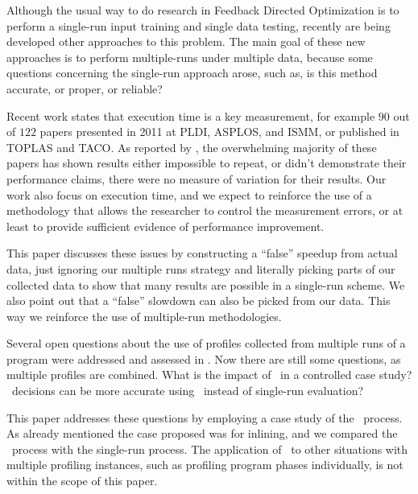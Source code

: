 
Although the usual way to do research in Feedback Directed Optimization is to perform a single-run input training and single data testing, recently are being developed other approaches to this problem. The main goal of these new approaches is to perform multiple-runs under multiple data, because some questions concerning the single-run approach arose, such as, is this method accurate, or proper, or reliable?

Recent work \cite{Kalibera2013} states that execution time is a key measurement, for example $90$ out of $122$ papers presented in 2011 at PLDI, ASPLOS, and ISMM, or published in TOPLAS and TACO. As reported by \cite{Kalibera2013}, the overwhelming majority of these papers has shown results either impossible to repeat, or didn't demonstrate their performance claims, there were no measure of variation for their results. Our work also focus on execution time, and we expect to reinforce the use of a methodology that allows the researcher to control the measurement errors, or at least to provide sufficient evidence of performance improvement.


This paper discusses these issues by constructing a ``false'' speedup from actual data, just ignoring our multiple runs strategy and literally picking parts of our collected data to show that many results are possible in a single-run scheme. We also point out that a ``false'' slowdown can also be picked from our data. This way we reinforce the use of multiple-run methodologies.


Several open questions about the use of profiles collected from multiple runs of a program were addressed and assessed in \cite{BerubeISPASS12}. Now there are still some questions, as multiple profiles are combined. What is the impact of \CP\ in a controlled case study? \FDI\ decisions can be more accurate using \CP\ instead of single-run evaluation?

This paper addresses these questions by employing a case study of the \CP\ process. As already mentioned the case proposed was for inlining, and we compared the \CP\ process with the single-run process. The application of \CP\ to other situations with multiple profiling instances, such as profiling program phases individually, is not within the scope of this paper.


